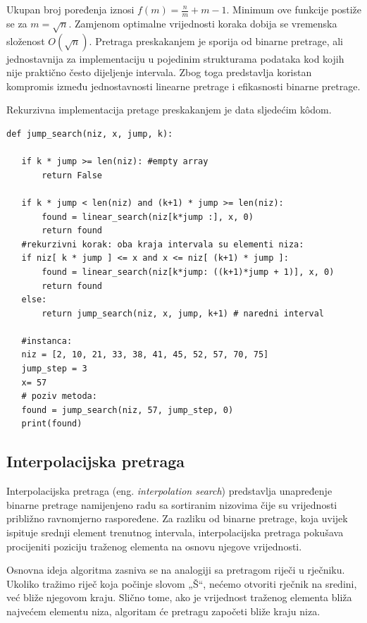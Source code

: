 Ukupan broj poređenja iznosi $f(m)=\frac{n}{m}+m-1.$
 Minimum ove funkcije postiže se za $m=\sqrt{n}.$ Zamjenom optimalne vrijednosti koraka dobija se vremenska složenost $O(\sqrt{n}).$ Pretraga preskakanjem je sporija od binarne pretrage, ali jednostavnija za implementaciju u pojedinim strukturama podataka kod kojih nije praktično često dijeljenje intervala. Zbog toga predstavlja koristan kompromis između jednostavnosti linearne pretrage i efikasnosti binarne pretrage.

 
 
Rekurzivna implementacija pretage preskakanjem  je data sljedećim k\^odom.  %
 
 \begin{verbatim}
def jump_search(niz, x, jump, k):

   if k * jump >= len(niz): #empty array
       return False

   if k * jump < len(niz) and (k+1) * jump >= len(niz): 
       found = linear_search(niz[k*jump :], x, 0)
       return found
   #rekurzivni korak: oba kraja intervala su elementi niza: 
   if niz[ k * jump ] <= x and x <= niz[ (k+1) * jump ]:
       found = linear_search(niz[k*jump: ((k+1)*jump + 1)], x, 0)
       return found
   else:
       return jump_search(niz, x, jump, k+1) # naredni interval

   #instanca:
   niz = [2, 10, 21, 33, 38, 41, 45, 52, 57, 70, 75]
   jump_step = 3
   x= 57
   # poziv metoda:
   found = jump_search(niz, 57, jump_step, 0)
   print(found)
\end{verbatim}

\subsection{Interpolacijska pretraga}

Interpolacijska pretraga (eng. \emph{interpolation search}) predstavlja unapređenje binarne pretrage namijenjeno radu sa sortiranim nizovima čije su vrijednosti približno ravnomjerno raspoređene. Za razliku od binarne pretrage, koja uvijek ispituje srednji element trenutnog intervala, interpolacijska pretraga pokušava procijeniti poziciju traženog elementa na osnovu njegove vrijednosti.

Osnovna ideja algoritma zasniva se na analogiji sa pretragom riječi u rječniku. Ukoliko tražimo riječ koja počinje slovom „Š“, nećemo otvoriti rječnik na sredini, već bliže njegovom kraju. Slično tome, ako je vrijednost traženog elementa bliža najvećem elementu niza, algoritam će pretragu započeti bliže kraju niza.

